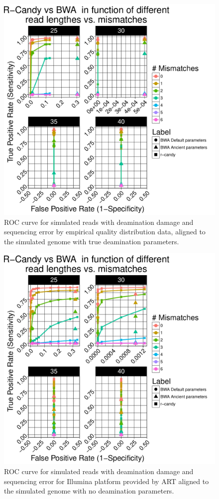 \documentclass[11pt,a4paper]{report}
\begin{document}
\begin{figure}[H]
\centering
\includegraphics[width=12cm]{pictures/bROC_DS2_emp.pdf}
\caption{ROC curve for simulated reads with deamination damage and sequencing error by empirical quality distribution data, aligned to the simulated genome
         with true deamination parameters.}
\label{DS2_emp}
\end{figure}

\begin{figure}[H]
\centering
\includegraphics[width=12cm]{pictures/bROC_DS2_ART.pdf}
\caption{ROC curve for simulated reads with deamination damage and sequencing error for Illumina platform provided by ART aligned to the simulated genome
         with no deamination parameters.}
\label{DS2_ART}
\end{figure}
\end{document}
